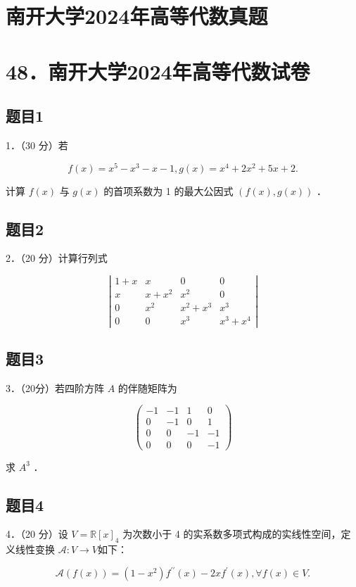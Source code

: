 \documentclass{article}
\begin{document}
\section*{南开大学2024年高等代数真题}
\section*{48．南开大学2024年高等代数试卷}

\subsection{题目1}
1．（30 分）若

\[
f(x)=x^{5}-x^{3}-x-1, g(x)=x^{4}+2 x^{2}+5 x+2 .
\]

计算 \(f(x)\) 与 \(g(x)\) 的首项系数为 1 的最大公因式 \((f(x), g(x))\) ．

\subsection{题目2}
2．（20 分）计算行列式

\[
\left|\begin{array}{cccc}
1+x & x & 0 & 0 \\
x & x+x^{2} & x^{2} & 0 \\
0 & x^{2} & x^{2}+x^{3} & x^{3} \\
0 & 0 & x^{3} & x^{3}+x^{4}
\end{array}\right|
\]

\subsection{题目3}
3．（20分）若四阶方阵 \(A\) 的伴随矩阵为

\[
\left(\begin{array}{cccc}
-1 & -1 & 1 & 0 \\
0 & -1 & 0 & 1 \\
0 & 0 & -1 & -1 \\
0 & 0 & 0 & -1
\end{array}\right)
\]

求 \(A^{3}\) ．

\subsection{题目4}
4．（20 分）设 \(V=\mathbb{R}[x]_{4}\) 为次数小于 4 的实系数多项式构成的实线性空间，定义线性变换 \(\mathcal{A}: V \rightarrow V\)如下：

\[
\mathcal{A}(f(x))=\left(1-x^{2}\right) f^{\prime \prime}(x)-2 x f^{\prime}(x), \forall f(x) \in V .
\]
\end{document}
